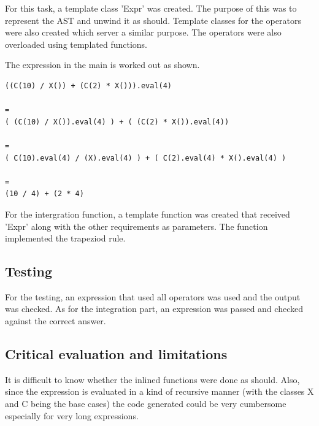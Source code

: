 \documentclass[a4paper, 12pt]{report}
\begin{document}
For this task, a template class  'Expr' was created. The purpose of this was to represent the AST and unwind it as should. Template classes for the operators were also created which server a similar purpose. The operators were also overloaded using templated functions.

The expression in the main is worked out as shown.

\begin{lstlisting}[frame = single, caption = Example of an expression]
((C(10) / X()) + (C(2) * X())).eval(4)

=
( (C(10) / X()).eval(4) ) + ( (C(2) * X()).eval(4))

=
( C(10).eval(4) / (X).eval(4) ) + ( C(2).eval(4) * X().eval(4) )

=
(10 / 4) + (2 * 4)
\end{lstlisting}

For the intergration function, a template function was created that received 'Expr' along with the other requirements as parameters. The function implemented the trapeziod rule.

\subsection{Testing}

For the testing, an expression that used all operators was used and the output was checked. As for the integration part, an expression was passed and checked against the correct answer.

\subsection{Critical evaluation and limitations}
It is difficult to know whether the inlined functions were done as should. Also, since the expression is evaluated in a kind of recursive manner (with the classes X  and  C being the base cases) the code generated could be very cumbersome especially for very long expressions.


\end{document}

